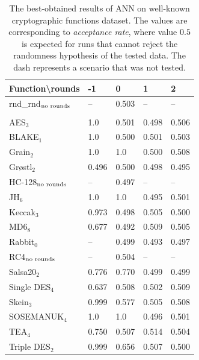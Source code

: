\documentclass[
    digital,    %
    oneside,    %
    color,
    11pt,
    nocover,
    notable,
    nolof,
    nolot,
]{fithesis3}
\newcommand{\fd}{\cellcolor{myred!15}}
\newcommand{\fn}{\cellcolor{mygreen!20}}
\begin{document}
\begin{table}
\centering
\begin{tabular}{l|l l l l}
\textbf{\large Function\textbackslash{}rounds} & \textbf{\large -1} & \textbf{\large 0} & \textbf{\large 1} & \textbf{\large 2}\\ \hline
rnd\_rnd$_{\textnormal{no rounds}}$& -- & \fn{}0.503 & --         & --         \\\\
AES$_{3}$        & \fd{}1.0   & \fn{}0.501 & \fn{}0.498 & \fn{}0.506 \\
BLAKE$_{1}$      & \fd{}1.0   & \fn{}0.500 & \fn{}0.501 & \fn{}0.503 \\
Grain$_{2}$      & \fd{}1.0   & \fd{}1.0   & \fn{}0.500 & \fn{}0.508 \\
Gr\o stl$_{2}$   & \fn{}0.496 & \fn{}0.500 & \fn{}0.498 & \fn{}0.495 \\
HC-128$_{\textnormal{no rounds}}$& --    & \fn{}0.497 & -- & --      \\
JH$_{6}$         & \fd{}1.0   & \fd{}1.0   & \fn{}0.495 & \fn{}0.501 \\
Keccak$_{3}$     & \fd{}0.973 & \fn{}0.498 & \fn{}0.505 & \fn{}0.500 \\
MD6$_{8}$        & \fd{}0.677 & \fn{}0.492 & \fn{}0.509 & \fn{}0.505 \\
Rabbit$_{0}$     &      --    & \fn{}0.499 & \fn{}0.493 & \fn{}0.497 \\
RC4$_{\textnormal{no rounds}}$& --         & \fn{}0.504 & --         & --         \\
Salsa20$_{2}$    & \fd{}0.776 & \fd{}0.770 & \fn{}0.499 & \fn{}0.499 \\
Single DES$_{4}$ & \fn{}0.637 & \fn{}0.508 & \fn{}0.502 & \fn{}0.509 \\
Skein$_{3}$      & \fd{}0.999 & \fd{}0.577 & \fn{}0.505 & \fn{}0.508 \\
SOSEMANUK$_{4}$  & \fd{}1.0   & \fd{}1.0   & \fn{}0.496 & \fn{}0.501 \\
TEA$_{4}$        & \fd{}0.750 & \fn{}0.507 & \fn{}0.514 & \fn{}0.504 \\
Triple DES$_{2}$ & \fd{}0.999 & \fd{}0.656 & \fn{}0.507 & \fn{}0.500
\end{tabular}
\caption{The best-obtained results of ANN on well-known cryptographic functions dataset. The values are corresponding to \textit{acceptance rate}, where value $0.5$ is expected for runs that cannot reject the randomness hypothesis of the tested data. The dash represents a scenario that was not tested.}
\label{table:res-usable-ann}
\end{table}
\end{document}
